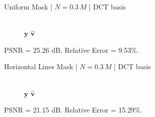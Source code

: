 \documentclass[xcolor=table]{beamer}
\numberwithin{equation}{section}
\let\bs\boldsymbol
\begin{document}
\begin{frame}{Uniform Mask | $N = 0.3\,M$ | DCT basis}
  \begin{figure}    
    \,
    \\
    $\bs y$ \hspace{2in} $\hat{\bs v}$
  \end{figure}
PSNR = 25.26 dB. Relative Error = 9.53\%.
\end{frame}

\begin{frame}{Horizontal Lines Mask | $N = 0.3\,M$ | DCT basis}
  \begin{figure}    
    \,
    \\
    $\bs y$ \hspace{2in} $\hat{\bs v}$
  \end{figure}
PSNR = 21.15 dB. Relative Error = 15.29\%.
\end{frame}
\end{document}
